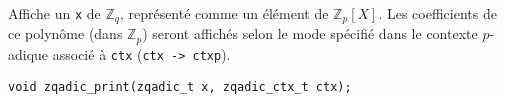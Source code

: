 \documentclass[11pt]{article}
\begin{document}
Affiche un \texttt{x} de $\mathbb{Z}_q$, représenté comme un élément de $\mathbb{Z}_p[X]$. Les coefficients de ce polynôme (dans $\mathbb{Z}_p$) seront affichés selon le mode spécifié dans le contexte $p$-adique associé à \texttt{ctx} (\texttt{ctx -> ctxp}).
\begin{verbatim}
void zqadic_print(zqadic_t x, zqadic_ctx_t ctx);
\end{verbatim}

%  
% 
\end{document}
